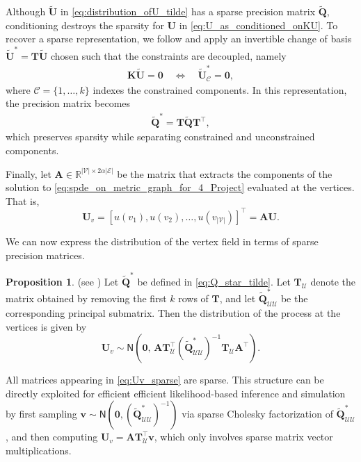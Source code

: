\documentclass[11pt,a4paper]{article}
\theoremstyle{plain}
\theoremstyle{definition}
\newtheorem{proposition}{Proposition}
\begin{document}
Although $\widetilde{\mathbf{U}}$ in \eqref{eq:distribution_ofU_tilde} has a sparse precision matrix $\widetilde{\mathbf{Q}}$, conditioning destroys the sparsity for $\mathbf{U}$ in \eqref{eq:U_as_conditioned_onKU}. To recover a sparse representation, we follow \cite{Bolin2021Efficient} and apply an invertible change of basis $\widetilde{\mathbf{U}}^* = \mathbf{T}\widetilde{\mathbf{U}}$ chosen such that the constraints are decoupled, namely
\begin{align*}
\mathbf{K}\widetilde{\mathbf{U}} = \mathbf{0}
\quad \Longleftrightarrow \quad
\widetilde{\mathbf{U}}^*_{\mathcal{C}} = \mathbf{0},
\end{align*}
where $\mathcal{C} = \{1,\ldots,k\}$ indexes the constrained components. In this representation, the precision matrix becomes
\begin{align}
\label{eq:Q_star_tilde}
\widetilde{\mathbf{Q}}^* = \mathbf{T}\widetilde{\mathbf{Q}}\mathbf{T}^\top,
\end{align}
which preserves sparsity while separating constrained and unconstrained components.


Finally, let $\mathbf{A}\in\mathbb{R}^{|\mathcal{V}| \times 2\alpha|\mathcal{E}|}$ be the matrix that extracts the components of the solution to \eqref{eq:spde_on_metric_graph_for_4_Project} evaluated at the vertices. That is,
\begin{equation}\label{eq:Uv}
	\mathbf{U}_v  = [u(v_1), u(v_2), \ldots, u(v_{|\mathcal{V}|})]^\top = \mathbf{A}\mathbf{U}.
\end{equation}

We can now express the distribution of the vertex field in terms of sparse precision matrices.

\begin{proposition}\textnormal{(see \cite[Corollary~4]{Bolin2023Statistical})}
\label{cor:sample_Uv}
Let $\widetilde{\mathbf{Q}}^*$ be defined in \eqref{eq:Q_star_tilde}. Let $\mathbf{T}_{\mathcal{U}}$ denote the matrix obtained by removing the first $k$ rows of $\mathbf{T}$, and let $\widetilde{\mathbf{Q}}^*_{\mathcal{U}\mathcal{U}}$ be the corresponding principal submatrix. Then the distribution of the process at the vertices is given by
\begin{equation}
\label{eq:Uv_sparse}
\mathbf{U}_v \sim \mathsf{N}\!\left(
\mathbf{0},\,
\mathbf{A}\mathbf{T}_{\mathcal{U}}^\top
\left(\widetilde{\mathbf{Q}}^*_{\mathcal{U}\mathcal{U}}\right)^{-1}
\mathbf{T}_{\mathcal{U}}\mathbf{A}^\top
\right).
\end{equation}
\end{proposition}

All matrices appearing in \eqref{eq:Uv_sparse} are sparse. This structure can be directly exploited for efficient efficient likelihood-based inference and simulation by first sampling $\mathbf{v} \sim \mathsf{N}(\mathbf{0}, (\widetilde{\mathbf{Q}}^*_{\mathcal{U}\mathcal{U}})^{-1})$ via sparse Cholesky factorization of $\widetilde{\mathbf{Q}}^*_{\mathcal{U}\mathcal{U}}$, and then computing $\mathbf{U}_v = \mathbf{A}\mathbf{T}_{\mathcal{U}}^\top \mathbf{v}$, which only involves sparse matrix vector multiplications.


 
\end{document}
